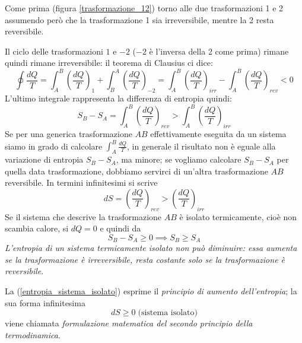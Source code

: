 \documentclass[class=book, crop=false, oneside, 12pt]{standalone}
\begin{document}
Come prima (figura \ref{trasformazione_12}) torno alle due trasformazioni 1 e 2 assumendo però che la trasformazione 1 sia irreversibile, mentre la 2 resta reversibile.

Il ciclo delle trasformazioni \(1\) e \(-2\) (\(-2\) è l'inversa della 2 come prima) rimane quindi rimane irreversibile: il teorema di Clausius ci dice:
\begin{equation*}
    \oint \frac{d Q}{T} = \int_A^B \left(\frac{d Q}{T}\right)_1 + \int_B^A \left(\frac{d Q}{T}\right)_{-2} = \int_A^B \left(\frac{d Q}{T}\right)_{irr} - \int_A^B \left(\frac{d Q}{T}\right)_{rev} < 0
\end{equation*}
L'ultimo integrale rappresenta la differenza di entropia quindi:
\begin{equation}
    S_B - S_A = \int_A^B \left(\frac{d Q}{T}\right)_{rev} > \int_A^B \left(\frac{d Q}{T}\right)_{irr}
\end{equation}
Se per una generica trasformazione \(A B\) effettivamente eseguita da un sistema siamo in grado di calcolare \(\int_A^B \frac{d Q}{T}\), in generale il risultato non è eguale alla variazione di entropia \(S_B - S_A\), ma minore;
se vogliamo calcolare \(S_B - S_A\) per quella data trasformazione, dobbiamo servirci di un'altra trasformazione \(A B\) reversibile.
In termini infinitesimi si scrive
\begin{equation}
    d S = \left(\frac{d Q}{T}\right)_{rev} > \left(\frac{d Q}{T}\right)_{irr}
\end{equation}
Se il sistema che descrive la trasformazione \(A B\) è isolato termicamente, cioè non scambia calore, si \(d Q = 0\) e quindi da
\begin{equation} \label{entropia_sistema_isolato}
    S_B - S_A \geq 0 \implies S_B \geq S_A
\end{equation}
\emph{L'entropia di un sistema termicamente isolato non può diminuire: essa aumenta se la trasformazione è irreversibile, resta costante solo se la trasformazione è reversibile}.

La (\ref{entropia_sistema_isolato}) esprime il \emph{principio di aumento dell'entropia}; la sua forma infinitesima
\begin{equation}
    d S \geq 0 \; \text{(sistema isolato)}
\end{equation}
viene chiamata \emph{formulazione matematica del secondo principio della termodinamica}.
\end{document}
